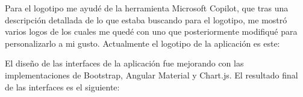 Para el logotipo me ayudé de la herramienta Microsoft Copilot, que tras una descripción detallada de lo que estaba buscando para el logotipo, me mostró varios logos de los cuales me quedé con uno que posteriormente modifiqué para personalizarlo a mi gusto. Actualmente el logotipo de la aplicación es este:


\hfill

El diseño de las interfaces de la aplicación fue mejorando con las implementaciones de Bootstrap, Angular Material y Chart.js. El resultado final de las interfaces es el siguiente:

